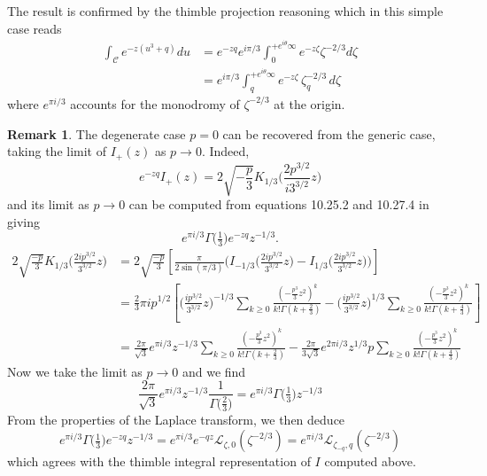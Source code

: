 \documentclass{article}
\newcommand{\laplace}{\mathcal{L}}
\theoremstyle{definition}
\newtheorem{remark}[definition]{Remark}
\theoremstyle{plain}
\newenvironment{verify}{\color{ForestGreen}}{\color{black}}
\begin{document}
The result is confirmed by the thimble projection reasoning which in this simple case reads
\begin{align*}
    \int_{\mathcal{C}} e^{-z (u^3+q)} du &= e^{-zq} e^{i\pi/3} \int_0^{+e^{i\theta}\infty} e^{-z\zeta} \zeta^{-2/3} d\zeta\\
    &= e^{i\pi/3} \int_q^{+e^{i\theta}\infty} e^{-z\zeta} \, \zeta_q^{-2/3}\,  d\zeta
\end{align*}
where $e^{\pi i/3}$ accounts for the monodromy of $\zeta^{-2/3}$ at the origin. 
\begin{remark}
    The degenerate case $p=0$ can be recovered from the generic case, taking the limit of $I_+(z)$ as $p\to 0$. Indeed, 
    \[ e^{-zq} I_+(z)=2 \sqrt{-\frac{p}{3}} K_{1/3}\Big(\frac{2p^{3/2}}{i3^{3/2}}z\Big)\]
    and its limit as $p\to 0$ can be computed from equations 10.25.2 and 10.27.4 in \cite{dlmf} giving 
    \[ e^{\pi i/3} \Gamma\big(\tfrac{1}{3}\big) e^{-zq} z^{-1/3}.  \]
    \begin{verify}
        \begin{align*}
            2\sqrt{\frac{-p}{3}} K_{1/3}\Big(\frac{2ip^{3/2}}{3^{3/2}}z\Big)&=2\sqrt{\frac{-p}{3}}\left[\frac{\pi}{2\sin(\pi/3)}\Big(I_{-1/3}\big(\tfrac{2ip^{3/2}}{3^{3/2}}z\big)-I_{1/3}\big(\tfrac{2ip^{3/2}}{3^{3/2}}z\big)\Big)\right]\\
            &=\frac{2}{3}\pi ip^{1/2}\left[\Big(\frac{ip^{3/2}}{3^{3/2}}z\Big)^{-1/3}\sum_{k\geq 0}\frac{(-\tfrac{p^3}{3}z^2)^k}{k!\Gamma(k+\tfrac{2}{3})}-\Big(\frac{ip^{3/2}}{3^{3/2}}z\Big)^{1/3}\sum_{k\geq 0}\frac{(-\tfrac{p^3}{3}z^2)^k}{k!\Gamma(k+\tfrac{4}{3})}\right]\\
            &=\frac{2\pi}{\sqrt{3}} e^{\pi i/3} z^{-1/3} \sum_{k\geq 0}\frac{(-\tfrac{p^3}{3}z^2)^k}{k!\Gamma(k+\tfrac{2}{3})}-\frac{2\pi }{3\sqrt{3}} e^{2\pi i/3} z^{1/3} p \sum_{k\geq 0}\frac{(-\tfrac{p^3}{3}z^2)^k}{k!\Gamma(k+\tfrac{4}{3})}
        \end{align*}
         Now we take the limit as $p\to 0$ and we find 
         \[\frac{2\pi}{\sqrt{3}} e^{\pi i/3} z^{-1/3} \frac{1}{\Gamma\big(\tfrac{2}{3}\big)}=e^{\pi i/3} \Gamma\big(\tfrac{1}{3}\big) z^{-1/3}\]
    \end{verify}
    From the properties of the Laplace transform, we then deduce
    \[e^{\pi i/3} \Gamma\big(\tfrac{1}{3}\big) e^{-zq} z^{-1/3}= e^{\pi i/3} e^{-qz} \laplace_{\zeta,0}(\zeta^{-2/3}) = e^{\pi i/3} \laplace_{\zeta_{-q},q}(\zeta^{-2/3})\]
    which agrees with the thimble integral representation of $I$ computed above. 
\end{remark}
\end{document}
